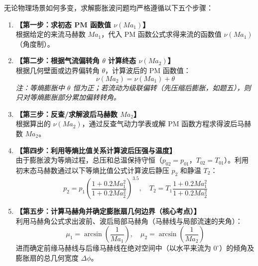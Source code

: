 \documentclass[11pt,a4paper]{ctexart}
\begin{document}
\begin{tcolorbox}[
    colback=red!5!white,
    colframe=red!75!black,
    title=\textbf{普朗特-迈耶等熵膨胀波解题“五步走”通用流程},
    fonttitle=\bfseries,
    boxrule=1.5pt,
    arc=4pt
]
无论物理场景如何多变，求解膨胀波问题均严格遵循以下五个步骤：
\begin{enumerate}
    \item \textbf{【第一步：求初态 PM 函数值 $\nu(Ma_1)$】} \\
    根据给定的来流马赫数 $Ma_1$，代入 PM 函数公式求得来流的函数值 $\nu(Ma_1)$（角度制）。
    
    \item \textbf{【第二步：根据气流偏转角 $\theta$ 计算终态 $\nu(Ma_2)$】} \\
    根据几何壁面或边界偏转角 $\theta$，计算波后的 PM 函数值：
    \begin{equation}
        \nu(Ma_2) = \nu(Ma_1) + \theta
    \end{equation}
    \textit{注：等熵膨胀中 $\theta$ 恒为正；若流动为级联偏转（先压缩后膨胀，如题五），则只对等熵膨胀部分累加偏转转角。}
    
    \item \textbf{【第三步：反查/求解波后马赫数 $Ma_2$】} \\
    根据算出的 $\nu(Ma_2)$，通过反查气动力学表或解 PM 函数方程求得波后马赫数 $Ma_2$。
    
    \item \textbf{【第四步：利用等熵比值关系计算波后压强与温度】} \\
    由于膨胀波为等熵过程，总压和总温保持守恒（$p_{02}=p_{01}$，$T_{02}=T_{01}$）。利用初末态马赫数通过以下等熵比值公式计算波后静压 $p_2$ 和静温 $T_2$：
    \begin{equation}
        p_2 = p_1 \left( \frac{1 + 0.2 Ma_1^2}{1 + 0.2 Ma_2^2} \right)^{3.5}, \quad T_2 = T_1 \frac{1 + 0.2 Ma_1^2}{1 + 0.2 Ma_2^2}
    \end{equation}
    
    \item \textbf{【第五步：计算马赫角并确定膨胀扇几何边界（核心考点）】} \\
    利用马赫角公式求出波前、波后局部马赫角（马赫线与局部流速的夹角）：
    \begin{equation}
        \mu_1 = \arcsin\left(\frac{1}{Ma_1}\right), \quad \mu_2 = \arcsin\left(\frac{1}{Ma_2}\right)
    \end{equation}
    进而确定前缘马赫线与后缘马赫线在绝对空间中（以水平来流为 $0^\circ$）的倾角及膨胀扇的总几何宽度 $\Delta\phi$。
\end{enumerate}
\end{tcolorbox}
\end{document}
